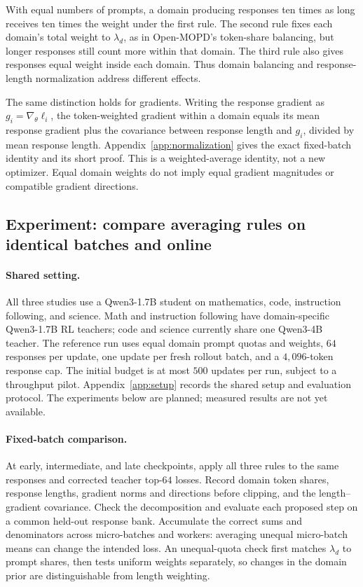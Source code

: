 With equal numbers of prompts, a domain producing responses ten times
as long receives ten times the weight under the first rule. The second
rule fixes each domain's total weight to $\lambda_d$, as in Open-MOPD's
token-share balancing, but longer responses still count more within
that domain. The third rule also gives responses equal weight inside
each domain. Thus domain balancing and response-length normalization
address different effects.

The same distinction holds for gradients. Writing the response gradient
as $g_i=\nabla_\theta\ell_i$, the token-weighted gradient within a domain
equals its mean response gradient plus the covariance between response
length and $g_i$, divided by mean response length.
Appendix~\ref{app:normalization} gives the exact fixed-batch identity
and its short proof. This is a weighted-average identity, not a new
optimizer. Equal domain weights do not imply equal gradient magnitudes
or compatible gradient directions.

\subsection{Experiment: compare averaging rules on identical batches and online}

\paragraph{Shared setting.}
All three studies use a Qwen3-1.7B student on mathematics, code,
instruction following, and science. Math and instruction following have
domain-specific Qwen3-1.7B RL teachers; code and science currently share
one Qwen3-4B teacher. The reference run uses equal domain prompt quotas
and weights, $64$ responses per update, one update per fresh rollout
batch, and a $4{,}096$-token response cap. The initial budget is at most
$500$ updates per run, subject to a throughput pilot.
Appendix~\ref{app:setup} records the shared setup and evaluation protocol.
The experiments below are planned; measured results are not yet available.

\paragraph{Fixed-batch comparison.}
At early, intermediate, and late checkpoints, apply all three rules to
the same responses and corrected teacher top-$64$ losses. Record domain
token shares, response lengths, gradient norms and directions before
clipping, and the length--gradient covariance. Check the decomposition
and evaluate each proposed step on a common held-out response bank.
Accumulate the correct sums and denominators across micro-batches and
workers: averaging unequal micro-batch means can change the intended
loss. An unequal-quota check first matches $\lambda_d$ to prompt shares,
then tests uniform weights separately, so changes in the domain prior
are distinguishable from length weighting.

